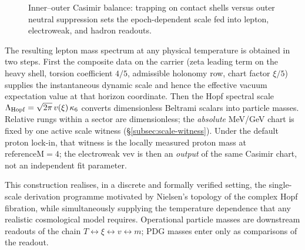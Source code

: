 \documentclass[11pt]{amsart}
\begin{document}
\begin{figure}[ht]
  \centering
  \small
  \caption{Inner--outer Casimir balance: trapping on contact shells versus outer neutral suppression sets the epoch-dependent scale fed into lepton, electroweak, and hadron readouts.}
  \label{fig:casimir-balance}
\end{figure}

The resulting lepton mass spectrum at any physical temperature is obtained in two steps. First the composite data on the carrier (zeta leading term on the heavy shell, torsion coefficient $4/5$, admissible holonomy row, chart factor $\xi/5$) supplies the instantaneous dynamic scale and hence the effective vacuum expectation value at that horizon coordinate. Then the Hopf spectral scale $\Lambda_{\rm Hopf}=\sqrt{2\pi}\,v(\xi)\,\kappa_6$ converts dimensionless Beltrami scalars into particle masses. Relative rungs within a sector are dimensionless; the \emph{absolute} MeV/GeV chart is fixed by one active scale witness (\S\ref{subsec:scale-witness}). Under the default proton lock-in, that witness is the locally measured proton mass at $\mathrm{referenceM}=4$; the electroweak vev is then an \emph{output} of the same Casimir chart, not an independent fit parameter.

This construction realises, in a discrete and formally verified setting, the single-scale derivation programme motivated by Nielsen's topology of the complex Hopf fibration, while simultaneously supplying the temperature dependence that any realistic cosmological model requires. Operational particle masses are downstream readouts of the chain $T\leftrightarrow \xi\leftrightarrow v\leftrightarrow m$; PDG masses \cite{pdg2024} enter only as comparisons of the readout.
\end{document}
